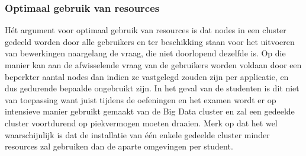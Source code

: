 \subsubsection{Optimaal gebruik van resources}
Hét argument voor optimaal gebruik van resources is dat nodes in een cluster gedeeld worden door alle gebruikers en ter beschikking staan voor het uitvoeren van bewerkingen naargelang de vraag, die niet doorlopend dezelfde is. Op die manier kan aan de afwisselende vraag van de gebruikers worden voldaan door een beperkter aantal nodes dan indien ze vastgelegd zouden zijn per applicatie, en dus gedurende bepaalde ongebruikt zijn.
\newline
In het geval van de studenten is dit niet van toepassing want juist tijdens de oefeningen en het examen wordt er op intensieve manier gebruikt gemaakt van de Big Data cluster en zal een gedeelde cluster voortdurend op piekvermogen moeten draaien.
\newline
Merk op dat het wel waarschijnlijk is dat de installatie van één enkele gedeelde cluster minder resources zal gebruiken dan de aparte omgevingen per student.

